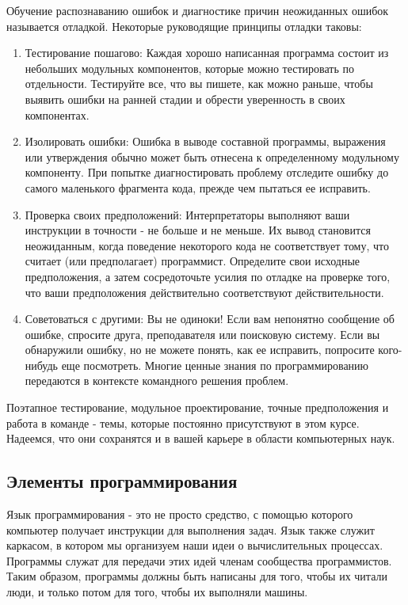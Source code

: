 Обучение распознаванию ошибок и диагностике причин неожиданных ошибок называется отладкой. Некоторые руководящие принципы отладки таковы:
\begin{enumerate}
  \item Тестирование пошагово: Каждая хорошо написанная программа состоит из небольших модульных компонентов, которые можно тестировать по отдельности. Тестируйте все, что вы пишете, как можно раньше, чтобы выявить ошибки на ранней стадии и обрести уверенность в своих компонентах.
  \item Изолировать ошибки: Ошибка в выводе составной программы, выражения или утверждения обычно может быть отнесена к определенному модульному компоненту. При попытке диагностировать проблему отследите ошибку до самого маленького фрагмента кода, прежде чем пытаться ее исправить.
  \item Проверка своих предположений: Интерпретаторы выполняют ваши инструкции в точности - не больше и не меньше. Их вывод становится неожиданным, когда поведение некоторого кода не соответствует тому, что считает (или предполагает) программист. Определите свои исходные предположения, а затем сосредоточьте усилия по отладке на проверке того, что ваши предположения действительно соответствуют действительности.
  \item Советоваться с другими: Вы не одиноки! Если вам непонятно сообщение об ошибке, спросите друга, преподавателя или поисковую систему. Если вы обнаружили ошибку, но не можете понять, как ее исправить, попросите кого-нибудь еще посмотреть. Многие ценные знания по программированию передаются в контексте командного решения проблем.
  \end{enumerate}

Поэтапное тестирование, модульное проектирование, точные предположения и работа в команде - темы, которые постоянно присутствуют в этом курсе. Надеемся, что они сохранятся и в вашей карьере в области компьютерных наук.

\subsection{Элементы программирования}
Язык программирования - это не просто средство, с помощью которого компьютер получает инструкции для выполнения задач. Язык также служит каркасом, в котором мы организуем наши идеи о вычислительных процессах. Программы служат для передачи этих идей членам сообщества программистов. Таким образом, программы должны быть написаны для того, чтобы их читали люди, и только потом для того, чтобы их выполняли машины.

